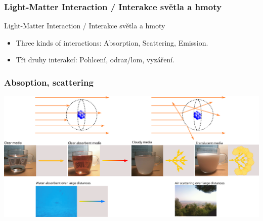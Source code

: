 \begin{frame}
\frametitle{Light-Matter Interaction / Interakce světla a hmoty}
\begin{center}
\Huge {\color{white}Light-Matter Interaction / Interakce světla a hmoty}
\end{center}
\end{frame}

\begin{frame}
  \scriptsize
  \begin{itemize}
    \item Three kinds of interactions: Absorption, Scattering, Emission.
  \end{itemize}
  \begin{itemize}
    \item Tři druhy interakcí: Pohlcení, odraz/lom, vyzáření.
  \end{itemize}
  \frametitle{Absoption, scattering}
  \includegraphics[width=\textwidth]{pics/physicallyBasedRendering/scattering_absorption2/scattering_absorption}
\end{frame}

